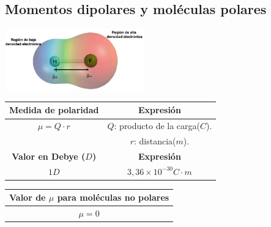     \subsection{Momentos dipolares y moléculas polares} 
        \begin{center} \includegraphics[width=6cm]{./imagenes/momentosDipolaresYMoleculasPolares.png} \end{center}
        \begin{center}
            \begin{tabular}{| c | c |}
                \toprule
                \textbf{Medida de polaridad} & \textbf{Expresión} \\
                \midrule
                $\mu = Q \cdot r$ & $Q$: producto de la carga($C$). \\& $r$: distancia($m$). \\
                \midrule
                \textbf{Valor en Debye ($D$)} & \textbf{Expresión} \\
                \midrule
                $1D$ & $3,36 \times 10^{-30}C \cdot m$ \\
                \midrule
            \end{tabular}
        \end{center}
        \columnbreak{}
        \begin{center}
            \begin{tabular}{| c |}
                \toprule
                \textbf{Valor de $\mu$ para moléculas no polares} \\
                \midrule
                $\mu = 0$ \\
                \bottomrule
            \end{tabular}
        \end{center}
